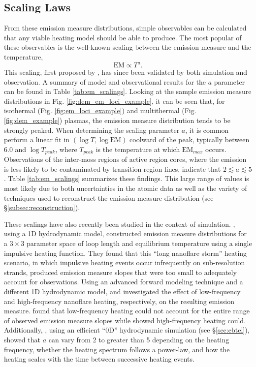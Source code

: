 \subsection{Scaling Laws}
\label{subsec:scaling}
%
\par From these emission measure distributions, simple observables can be calculated that any viable heating model should be able to produce. The most popular of these observables is the well-known scaling between the emission measure and the temperature, 
\begin{equation}
	\mathrm{EM}\propto T^a.
\end{equation}
This scaling, first proposed by \citet{jordan_energy_1980}, has since been validated by both simulation and observation. A summary of model and observational results for the $a$ parameter can be found in Table \ref{tab:em_scalings}. Looking at the sample emission measure distributions in Fig. \ref{fig:dem_em_loci_example}, it can be seen that, for isothermal (Fig. \ref{fig:em_loci_example}) and multithermal (Fig. \ref{fig:dem_example}) plasmas, the emission measure distribution tends to be strongly peaked. When determining the scaling parameter $a$, it is common perform a linear fit in $(\log{T},\log{\mathrm{EM}})$ coolward of the peak, typically between 6.0 and $\log{T_{peak}}$, where $T_{peak}$ is the temperature at which $\mathrm{EM}_{max}$ occurs. Observations of the inter-moss regions of active region cores, where the emission is less likely to be contaminated by transition region lines, indicate that $2\lesssim a\lesssim5$. Table \ref{tab:em_scalings} summarizes these findings. This large range of values is most likely due to both uncertainties in the atomic data as well as the variety of techniques used to reconstruct the emission measure distribution (see \S\ref{subsec:reconstruction}).
%
\par These scalings have also recently been studied in the context of simulation. \citet{mulu-moore_can_2011}, using a 1D hydrodynamic model, constructed emission measure distributions for a $3\times3$ parameter space of loop length and equilibrium temperature using a single impulsive heating function. They found that this ``long nanoflare storm'' heating scenario, in which impulsive heating events occur infrequently on sub-resolution strands, produced emission measure slopes that were too small to adequately account for observations. Using an advanced forward modeling technique and a different 1D hydrodynamic model, \citet{bradshaw_diagnosing_2012} and \citet{reep_diagnosing_2013} investigated the effect of low-frequency and high-frequency nanoflare heating, respectively, on the resulting emission measure. \citet{bradshaw_diagnosing_2012} found that low-frequency heating could not account for the entire range of observed emission measure slopes while \citet{reep_diagnosing_2013} showed high-frequency heating could. Additionally, \citet{cargill_active_2014}, using an efficient ``0D'' hydrodynamic simulation (see \S\ref{sec:ebtel}), showed that $a$ can vary from 2 to greater than 5 depending on the heating frequency, whether the heating spectrum follows a power-law, and how the heating scales with the time between successive heating events.
